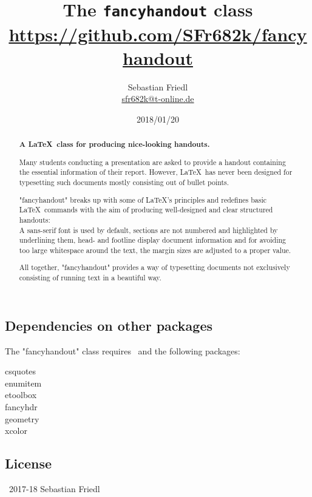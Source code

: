 \documentclass[11pt]{ltxdoc}
\title{The \texttt{fancyhandout} class \\ {\large\url{https://github.com/SFr682k/fancyhandout}}}
\author{Sebastian Friedl \\ \href{mailto:sfr682k@t-online.de}{\ttfamily sfr682k@t-online.de}}
\date{2018/01/20}
\begin{document}
	\maketitle
	
	\begin{abstract}\parindent0pt%
		\noindent%
		\textbf{A \LaTeX\ class for producing nice-looking handouts.}
		
		\smallskip
		Many students conducting a presentation are asked to provide a handout containing the essential information of their report.
		However, \LaTeX\ has never been designed for typesetting such documents mostly consisting out of bullet points.
		
		\smallskip
		"fancyhandout" breaks up with some of \LaTeX's principles and redefines basic \LaTeX\ commands with the aim of producing well-designed and clear structured handouts: \\
		A \textsf{sans-serif} font is used by default, sections are not numbered and highlighted by underlining them, head- and footline display document information and for avoiding too large whitespace around the text, the margin sizes are adjusted to a proper value.
		
		\smallskip
		All together, "fancyhandout" provides a way of typesetting documents not exclusively consisting of running text in a beautiful way.
	\end{abstract}

	
	\tableofcontents
	\clearpage
	
	
	
	\subsection*{Dependencies on other packages}
	The "fancyhandout" class requires \LaTeXe\ and the following packages:
	\begin{multicols}{3}\ttfamily\centering
		csquotes \\ enumitem \\ etoolbox \\ fancyhdr \\ geometry \\ xcolor
	\end{multicols}
	
	\subsection*{License}
	\textcopyright\ 2017-18 Sebastian Friedl
	
\end{document}
